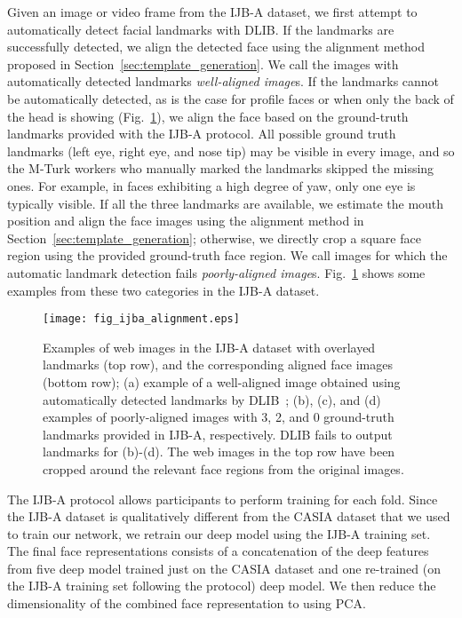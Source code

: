 \documentclass[10pt,journal,compsoc]{IEEEtran}
\begin{document}
Given an image or video frame from the IJB-A dataset, we first attempt to automatically detect  facial landmarks with DLIB. If the landmarks are successfully detected, we align the detected face using the alignment method proposed in Section~\ref{sec:template_generation}. We call the images with automatically detected landmarks \emph{well-aligned image}s. If the landmarks cannot be automatically detected, as is the case for profile faces or when only the back of the head is showing (Fig.~\ref{fig:ijba-alignment}), we align the face based on the ground-truth landmarks provided with the IJB-A protocol. All possible ground truth landmarks (left eye, right eye, and nose tip) may be visible in every image, and so the M-Turk workers who manually marked the landmarks skipped the missing ones. For example, in faces exhibiting a high degree of yaw, only one eye is typically visible. If all the three landmarks are available, we estimate the mouth position and align the face images using the alignment method in Section~\ref{sec:template_generation}; otherwise, we directly crop a square face region using the provided ground-truth face region. We call images for which the automatic landmark detection fails \emph{poorly-aligned image}s. Fig.~\ref{fig:ijba-alignment} shows some examples from these two categories in the IJB-A dataset.

\newcommand{\mtablew}{0.70in}
\newcommand{\mimgw}{0.65in}
\begin{figure}
\centering
  \texttt{[image: fig\_ijba\_alignment.eps]}
  \caption{Examples of web images in the IJB-A dataset with overlayed landmarks (top row), and the corresponding aligned face images (bottom row); (a) example of a well-aligned image obtained using automatically detected landmarks by DLIB~\cite{kazemi2014one}; (b), (c), and (d) examples of poorly-aligned images with 3, 2, and 0 ground-truth landmarks provided in IJB-A, respectively. DLIB fails to output landmarks for (b)-(d). The web images in the top row have been cropped around the relevant face regions from the original images.} \label{fig:ijba-alignment}
\end{figure}

The IJB-A protocol allows participants to perform training for each fold. Since the IJB-A dataset is qualitatively different from the CASIA dataset that we used to train our network, we retrain our deep model using the IJB-A training set. The final face representations consists of a concatenation of the deep features from five deep model trained just on the CASIA dataset and one re-trained (on the IJB-A training set following the protocol) deep model. We then reduce the dimensionality of the combined face representation to  using PCA.
\end{document}
